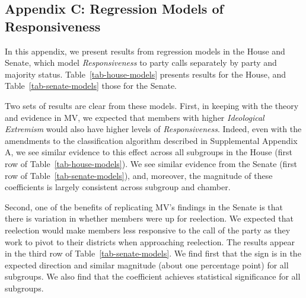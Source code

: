 \documentclass[12pt]{article}
\begin{document}
\clearpage

\subsection*{Appendix C: Regression Models of Responsiveness}
%

In this appendix, we present results from regression models in the House and Senate, which model \textit{Responsiveness} to party calls separately by party and majority status.
Table~\ref{tab-house-models} presents results for the House, and Table~\ref{tab-senate-models} those for the Senate.

Two sets of results are clear from these models. First, in keeping with the theory and evidence in MV, we expected that members with higher \textit{Ideological Extremism} would also have higher levels of \textit{Responsiveness}.  Indeed, even with the amendments to the classification algorithm described in Supplemental Appendix A, we see similar evidence to this effect across all subgroups in the House (first row of Table~\ref{tab-house-models}).  We see similar evidence from the Senate (first row of Table~\ref{tab-senate-models}), and, moreover, the magnitude of these coefficients is largely consistent across subgroup and chamber.

Second, one of the benefits of replicating MV's findings in the Senate is that there is variation in whether members were up for reelection.  We expected that reelection would make members less responsive to the call of the party as they work to pivot to their districts when approaching reelection.  The results appear in the third row of Table~\ref{tab-senate-models}.  We find first that the sign is in the expected direction and similar magnitude (about one percentage point) for all subgroups.  We also find that the coefficient achieves statistical significance for all subgroups.
\end{document}
